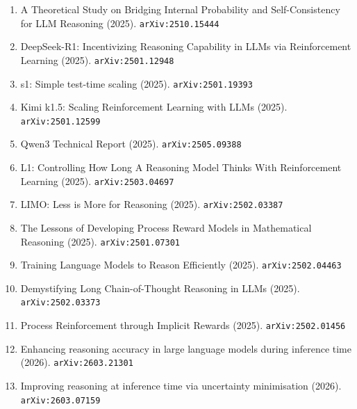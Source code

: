 \documentclass[11pt]{article}
\begin{document}
\begin{enumerate}
  \item A Theoretical Study on Bridging Internal Probability and Self-Consistency for LLM Reasoning (2025). \texttt{arXiv:2510.15444}
  \item DeepSeek-R1: Incentivizing Reasoning Capability in LLMs via Reinforcement Learning (2025). \texttt{arXiv:2501.12948}
  \item s1: Simple test-time scaling (2025). \texttt{arXiv:2501.19393}
  \item Kimi k1.5: Scaling Reinforcement Learning with LLMs (2025). \texttt{arXiv:2501.12599}
  \item Qwen3 Technical Report (2025). \texttt{arXiv:2505.09388}
  \item L1: Controlling How Long A Reasoning Model Thinks With Reinforcement Learning (2025). \texttt{arXiv:2503.04697}
  \item LIMO: Less is More for Reasoning (2025). \texttt{arXiv:2502.03387}
  \item The Lessons of Developing Process Reward Models in Mathematical Reasoning (2025). \texttt{arXiv:2501.07301}
  \item Training Language Models to Reason Efficiently (2025). \texttt{arXiv:2502.04463}
  \item Demystifying Long Chain-of-Thought Reasoning in LLMs (2025). \texttt{arXiv:2502.03373}
  \item Process Reinforcement through Implicit Rewards (2025). \texttt{arXiv:2502.01456}
  \item Enhancing reasoning accuracy in large language models during inference time (2026). \texttt{arXiv:2603.21301}
  \item Improving reasoning at inference time via uncertainty minimisation (2026). \texttt{arXiv:2603.07159}
\end{enumerate}
\end{document}
